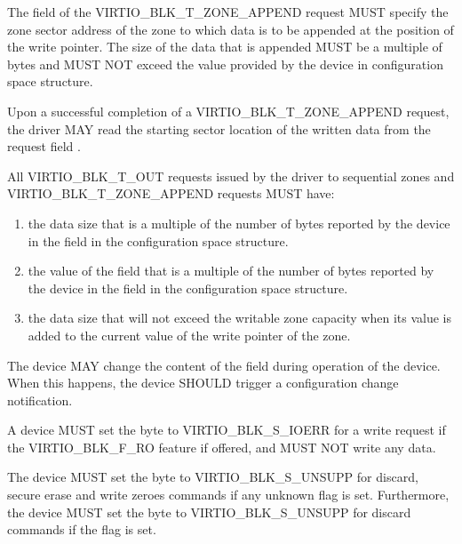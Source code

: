 The  field of the VIRTIO_BLK_T_ZONE_APPEND request MUST specify
the zone sector address of the zone to which data is to be appended at the
position of the write pointer. The size of the data that is appended MUST be a
multiple of  bytes and MUST NOT exceed the
 value provided by the device in
 configuration space structure.

Upon a successful completion of a VIRTIO_BLK_T_ZONE_APPEND request, the driver
MAY read the starting sector location of the written data from the request
field .

All VIRTIO_BLK_T_OUT requests issued by the driver to sequential zones and
VIRTIO_BLK_T_ZONE_APPEND requests MUST have:

\begin{enumerate}
\item the data size that is a multiple of the number of bytes reported
    by the device in the field  in the
     configuration space structure.

\item the value of the field  that is a multiple of the number of
    bytes reported by the device in the field  in the
     configuration space structure.

\item the data size that will not exceed the writable zone capacity when its
    value is added to the current value of the write pointer of the zone.

\end{enumerate}


The device MAY change the content of the  field during
operation of the device. When this happens, the device SHOULD trigger a
configuration change notification.

A device MUST set the  byte to VIRTIO_BLK_S_IOERR
for a write request if the VIRTIO_BLK_F_RO feature if offered, and MUST NOT
write any data.

The device MUST set the  byte to VIRTIO_BLK_S_UNSUPP for
discard, secure erase and write zeroes commands if any unknown flag is set.
Furthermore, the device MUST set the  byte to
VIRTIO_BLK_S_UNSUPP for discard commands if the  flag is set.

